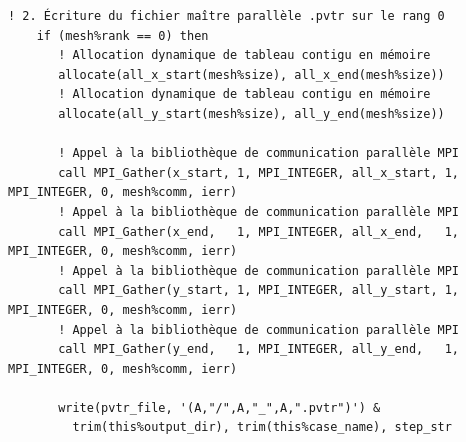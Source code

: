 \documentclass[10pt,a4paper,oneside]{book}
\begin{document}
\begin{lstlisting}[language={[95]Fortran}]
    ! 2. Écriture du fichier maître parallèle .pvtr sur le rang 0
    if (mesh%rank == 0) then
       ! Allocation dynamique de tableau contigu en mémoire
       allocate(all_x_start(mesh%size), all_x_end(mesh%size))
       ! Allocation dynamique de tableau contigu en mémoire
       allocate(all_y_start(mesh%size), all_y_end(mesh%size))

       ! Appel à la bibliothèque de communication parallèle MPI
       call MPI_Gather(x_start, 1, MPI_INTEGER, all_x_start, 1, MPI_INTEGER, 0, mesh%comm, ierr)
       ! Appel à la bibliothèque de communication parallèle MPI
       call MPI_Gather(x_end,   1, MPI_INTEGER, all_x_end,   1, MPI_INTEGER, 0, mesh%comm, ierr)
       ! Appel à la bibliothèque de communication parallèle MPI
       call MPI_Gather(y_start, 1, MPI_INTEGER, all_y_start, 1, MPI_INTEGER, 0, mesh%comm, ierr)
       ! Appel à la bibliothèque de communication parallèle MPI
       call MPI_Gather(y_end,   1, MPI_INTEGER, all_y_end,   1, MPI_INTEGER, 0, mesh%comm, ierr)

       write(pvtr_file, '(A,"/",A,"_",A,".pvtr")') &
         trim(this%output_dir), trim(this%case_name), step_str


\end{lstlisting}
\end{document}
